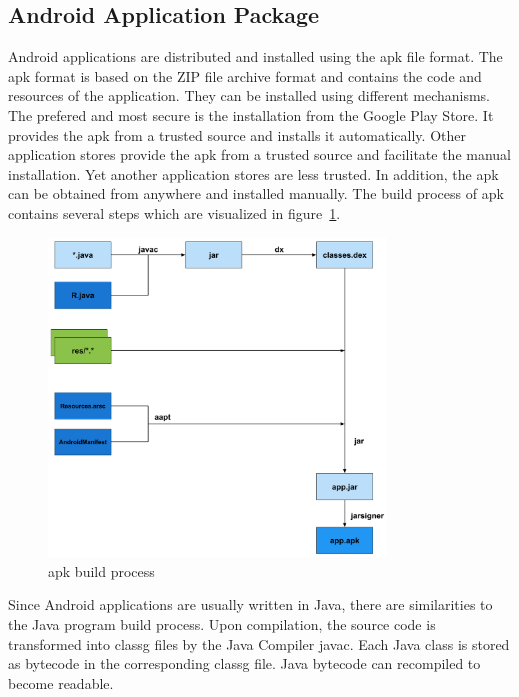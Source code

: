 \subsection{Android Application Package} \label{subsection:foundation-android-package}
Android applications are distributed and installed using the \gls{apk} file format.
The \gls{apk} format is based on the ZIP file archive format and contains the code and resources of the application.
They can be installed using different mechanisms.
The prefered and most secure is the installation from the Google Play Store.
It provides the \gls{apk} from a trusted source and installs it automatically.
Other application stores provide the \gls{apk} from a trusted source and facilitate the manual installation.
Yet another application stores are less trusted.
In addition, the \gls{apk} can be obtained from anywhere and installed manually.
\newline
The build process of \gls{apk} contains several steps which are visualized in figure~\ref{fig:apk}.
\newline
\begin{figure}[h]
    \centering
    \includegraphics[width=0.8\textwidth]{data/apk.png}
    \caption{\gls{apk} build process \cite{andevconDalvikART}}
    \label{fig:apk}
\end{figure}
Since Android applications are usually written in Java, there are similarities to the Java program build process.
Upon compilation, the source code is transformed into \gls{classg} files by the Java Compiler javac.
Each Java class is stored as bytecode in the corresponding \gls{classg} file.
Java bytecode can recompiled to become readable.
